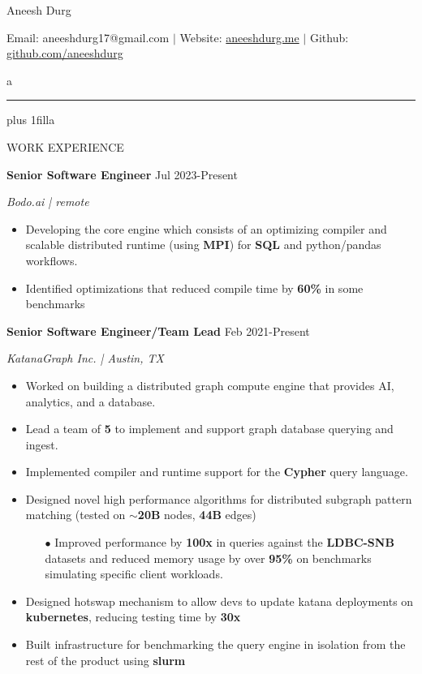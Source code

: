 \documentclass[paper=a4,fontsize=11pt]{scrartcl} %
\newcommand{\sepspace}{\vspace*{1em}}		%
\newcommand{\MyName}[1]{%
		\hspace{-1em}\Huge \usefont{OT1}{phv}{b}{n}#1
		\par \normalsize \normalfont }
\newcommand{\NewPart}[1]{ \noindent \large \usefont{OT1}{phv}{b}{n}\uppercase{#1} \normalfont \normalsize}
\newcommand{\EducationEntry}[4]{
		\noindent \textbf{#1}     %
			\hfill#2 \par  %
		\noindent \textit{#3} \par        %
		\noindent\hangafter=0 \small #4 %
		\normalsize \par}
\begin{document}

\MyName{Aneesh Durg}
Email: aneeshdurg17@gmail.com $\vert$ Website: \url{aneeshdurg.me} $\vert$ Github: \url{github.com/aneeshdurg}
\sepspace
\vspace{-1em}

\hspace{-2em}\color{White}a\color{Black}\leaders\hrule height 2.4pt\hskip 10pt plus 1fill\color{White}a\color{Black}

\hspace{-1.5em}
\sepspace

\vspace{-1.25em}
\NewPart{Work experience}{}

\EducationEntry{Senior Software Engineer}{Jul 2023-Present}{Bodo.ai | remote}{
\begin{itemize}
  \item Developing the core engine which consists of an optimizing compiler and scalable distributed runtime (using \textbf{MPI}) for \textbf{SQL} and python/pandas workflows.
  \item Identified optimizations that reduced compile time by \textbf{60\%} in some benchmarks
\end{itemize}
}

\EducationEntry{Senior Software Engineer/Team Lead}{Feb 2021-Present}{KatanaGraph Inc. | Austin, TX}{
\begin{itemize}
  \item Worked on building a distributed graph compute engine that provides AI, analytics, and a database.
  \item Lead a team of \textbf{5} to implement and support graph database querying and ingest.
  \item Implemented compiler and runtime support for the \textbf{Cypher} query language.
  \item Designed novel high performance algorithms for distributed subgraph pattern matching (tested on $\sim$\textbf{20B} nodes, \textbf{44B} edges)
  \begin{itemize}
    \item[$\bullet$] Improved performance by \textbf{100x} in queries against the \textbf{LDBC-SNB} datasets and reduced memory usage by over \textbf{95\%} on benchmarks simulating specific client workloads.
  \end{itemize}
  \item Designed hotswap mechanism to allow devs to update katana deployments on \textbf{kubernetes}, reducing testing time by \textbf{30x}
  \item Built infrastructure for benchmarking the query engine in isolation from the rest of the product using \textbf{slurm}
\end{itemize}
}
\end{document}
